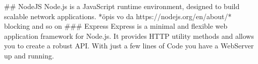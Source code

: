\begin{markdown}
## NodeJS
Node.js is a JavaScript runtime environment, designed to build scalable network applications\cite{Node}.
*öpis vo da https://nodejs.org/en/about/* blocking and so on
### Express
Express\cite{Express} is a minimal and flexible web application framework for Node.js. It provides HTTP utility methods and allows you to create a robust API.
With just a few lines of Code you have a WebServer up and running.




\end{markdown}
